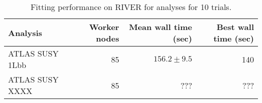 \begin{table}[htpb]
\centering
\caption{Fitting performance on RIVER for analyses for 10 trials.}
\label{table:performance}
\begin{tabular}{@{}lrrr@{}}
\toprule
       Analysis & Worker nodes & Mean wall time (sec) & Best wall time (sec) \\
\midrule
ATLAS SUSY 1Lbb &           85 &        $156.2\pm9.5$ &                  140 \\
ATLAS SUSY XXXX &           85 &                  ??? &                  ??? \\
\bottomrule
\end{tabular}
\end{table}
